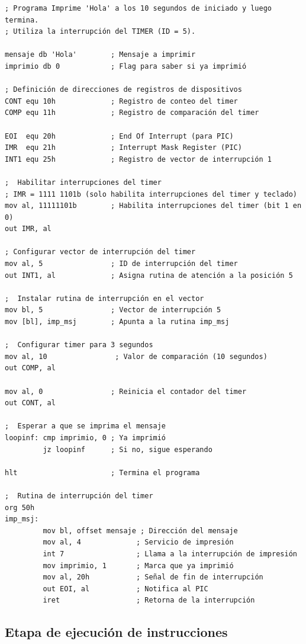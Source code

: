 \documentclass[12pt,oneside]{templates/unerthesis}
\begin{document}
\begin{lstlisting}
; Programa Imprime 'Hola' a los 10 segundos de iniciado y luego termina.
; Utiliza la interrupción del TIMER (ID = 5).

mensaje db 'Hola'        ; Mensaje a imprimir
imprimio db 0            ; Flag para saber si ya imprimió

; Definición de direcciones de registros de dispositivos
CONT equ 10h             ; Registro de conteo del timer
COMP equ 11h             ; Registro de comparación del timer

EOI  equ 20h             ; End Of Interrupt (para PIC)
IMR  equ 21h             ; Interrupt Mask Register (PIC)
INT1 equ 25h             ; Registro de vector de interrupción 1

;  Habilitar interrupciones del timer 
; IMR = 1111 1101b (solo habilita interrupciones del timer y teclado)
mov al, 11111101b        ; Habilita interrupciones del timer (bit 1 en 0)
out IMR, al

; Configurar vector de interrupción del timer 
mov al, 5                ; ID de interrupción del timer
out INT1, al             ; Asigna rutina de atención a la posición 5

;  Instalar rutina de interrupción en el vector 
mov bl, 5                ; Vector de interrupción 5
mov [bl], imp_msj        ; Apunta a la rutina imp_msj

;  Configurar timer para 3 segundos 
mov al, 10                ; Valor de comparación (10 segundos)
out COMP, al

mov al, 0                ; Reinicia el contador del timer
out CONT, al

;  Esperar a que se imprima el mensaje 
loopinf: cmp imprimio, 0 ; Ya imprimió
         jz loopinf      ; Si no, sigue esperando

hlt                      ; Termina el programa

;  Rutina de interrupción del timer 
org 50h
imp_msj:
         mov bl, offset mensaje ; Dirección del mensaje
         mov al, 4             ; Servicio de impresión
         int 7                 ; Llama a la interrupción de impresión
         mov imprimio, 1       ; Marca que ya imprimió
         mov al, 20h           ; Señal de fin de interrupción
         out EOI, al           ; Notifica al PIC
         iret                  ; Retorna de la interrupción\end{lstlisting}

\hypertarget{etapa-de-ejecuciuxf3n-de-instrucciones}{%
\subsection{Etapa de ejecución de instrucciones}\label{etapa-de-ejecuciuxf3n-de-instrucciones}}
\end{document}
